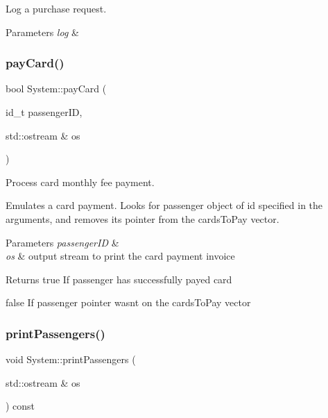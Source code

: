 Log a purchase request. 


\begin{DoxyParams}{Parameters}
{\em log} & \\
\hline
\end{DoxyParams}
\mbox{\label{classSystem_a93e28750e7677d09a7eb2acfc2590209}} 
\subsubsection{\texorpdfstring{pay\+Card()}{payCard()}}
{\footnotesize\ttfamily bool System\+::pay\+Card (\begin{DoxyParamCaption}\item[{id\+\_\+t}]{passenger\+ID,  }\item[{std\+::ostream \&}]{os }\end{DoxyParamCaption})}



Process card monthly fee payment. 

Emulates a card payment. Looks for passenger object of id specified in the arguments, and removes it\textquotesingle{}s pointer from the cards\+To\+Pay vector.


\begin{DoxyParams}{Parameters}
{\em passenger\+ID} & \\
\hline
{\em os} & output stream to print the card payment invoice \\
\hline
\end{DoxyParams}
\begin{DoxyReturn}{Returns}
true If passenger has successfully payed card 

false If passenger pointer wasn\textquotesingle{}t on the cards\+To\+Pay vector 
\end{DoxyReturn}
\mbox{\label{classSystem_a1c5753d5c70d15dc3fe56fd5e421ba76}} 
\subsubsection{\texorpdfstring{print\+Passengers()}{printPassengers()}}
{\footnotesize\ttfamily void System\+::print\+Passengers (\begin{DoxyParamCaption}\item[{std\+::ostream \&}]{os }\end{DoxyParamCaption}) const}



